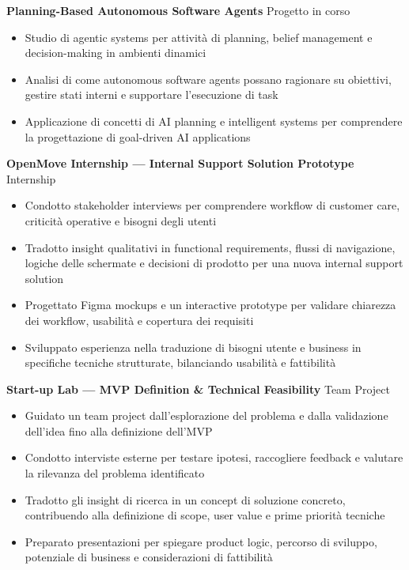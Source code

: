 \documentclass[11pt]{article}
\begin{document}
\textbf{Planning-Based Autonomous Software Agents} \hfill {\color{textgray}Progetto in corso} \\[-0.8em]
\begin{itemize}
\item Studio di agentic systems per attività di planning, belief management e decision-making in ambienti dinamici
\item Analisi di come autonomous software agents possano ragionare su obiettivi, gestire stati interni e supportare l’esecuzione di task
\item Applicazione di concetti di AI planning e intelligent systems per comprendere la progettazione di goal-driven AI applications
\end{itemize}

\vspace{4pt}

\textbf{OpenMove Internship — Internal Support Solution Prototype} \hfill {\color{textgray}Internship} \\[-0.8em]
\begin{itemize}
\item Condotto stakeholder interviews per comprendere workflow di customer care, criticità operative e bisogni degli utenti
\item Tradotto insight qualitativi in functional requirements, flussi di navigazione, logiche delle schermate e decisioni di prodotto per una nuova internal support solution
\item Progettato Figma mockups e un interactive prototype per validare chiarezza dei workflow, usabilità e copertura dei requisiti
\item Sviluppato esperienza nella traduzione di bisogni utente e business in specifiche tecniche strutturate, bilanciando usabilità e fattibilità
\end{itemize}

\vspace{4pt}

\textbf{Start-up Lab — MVP Definition \& Technical Feasibility} \hfill {\color{textgray}Team Project} \\[-0.8em]
\begin{itemize}
\item Guidato un team project dall’esplorazione del problema e dalla validazione dell’idea fino alla definizione dell’MVP
\item Condotto interviste esterne per testare ipotesi, raccogliere feedback e valutare la rilevanza del problema identificato
\item Tradotto gli insight di ricerca in un concept di soluzione concreto, contribuendo alla definizione di scope, user value e prime priorità tecniche
\item Preparato presentazioni per spiegare product logic, percorso di sviluppo, potenziale di business e considerazioni di fattibilità
\end{itemize}
\end{document}
